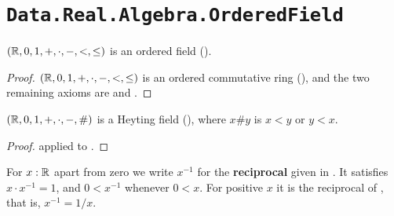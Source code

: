 \section{\texttt{Data.Real.Algebra.OrderedField}}

\begin{theorem}
  \label{ROrderedField}
  $(\mathbb{R}, 0, 1, +, \cdot, -, <, \le)$ is an ordered field ().
\end{theorem}
\begin{proof}
  $(\mathbb{R}, 0, 1, +, \cdot, -, <, \le)$ is an ordered commutative ring (), and the two remaining axioms are  and .
\end{proof}

\begin{corollary}
  \label{RHeytingField}
  $(\mathbb{R}, 0, 1, +, \cdot, -, \#)$ is a Heyting field (), where $x \# y$ is $x < y$ or $y < x$.
\end{corollary}
\begin{proof}
   applied to .
\end{proof}

\begin{definition}
  \label{recipAtInstance}
  For $x : \mathbb{R}$ apart from zero we write $x^{-1}$ for the \textbf{reciprocal} given in . It satisfies $x \cdot x^{-1} = 1$, and $0 < x^{-1}$ whenever $0 < x$. For positive $x$ it is the reciprocal of , that is, $x^{-1} = 1/x$.
\end{definition}
